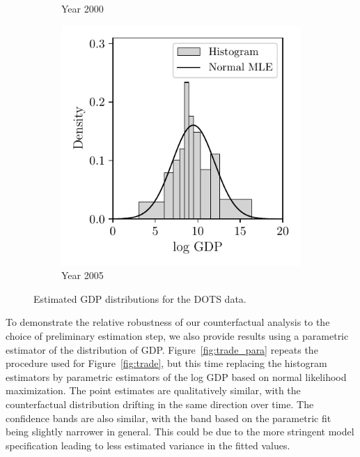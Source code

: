 \begin{figure}[ht]
\begin{subfigure}{0.32\textwidth}
    \caption{Year 2000}
  \end{subfigure}
  \begin{subfigure}{0.32\textwidth}
    \centering
    \includegraphics[scale=0.64]{graphics/trade_gdp_2005.pdf}
    \caption{Year 2005}
  \end{subfigure}
  \caption[Estimated GDP distributions for the DOTS data]{
  Estimated GDP distributions for the DOTS data.}
  \label{fig:gdp}
\end{figure}

To demonstrate the relative robustness of our counterfactual analysis to the
choice of preliminary estimation step, we also provide results using a
parametric estimator of the distribution of GDP. Figure~\ref{fig:trade_para}
repeats the procedure used for Figure~\ref{fig:trade}, but this time replacing
the histogram estimators by parametric estimators of the log GDP based on
normal likelihood maximization. The point estimates are qualitatively similar,
with the counterfactual distribution drifting in the same direction over time.
The confidence bands are also similar, with the band based on the parametric
fit being slightly narrower in general. This could be due to the more stringent
model specification leading to less estimated variance in the fitted values.

